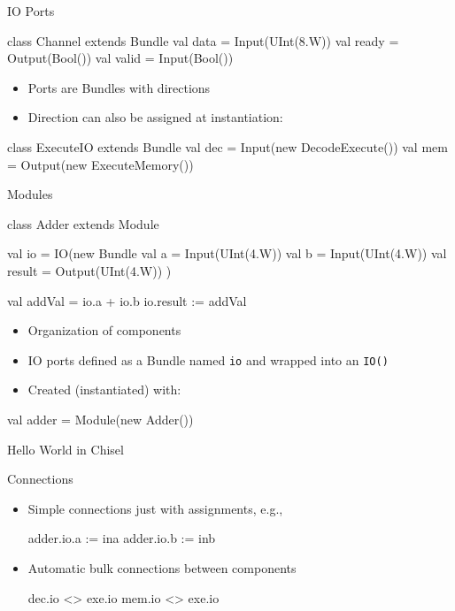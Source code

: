 \documentclass[xcolor=pdflatex,dvipsnames,table]{beamer}
\newcommand{\code}[1]{{\texttt{#1}}}
\begin{document}
\begin{frame}[fragile]{IO Ports}
\begin{chisel}
class Channel extends Bundle {
  val data = Input(UInt(8.W))
  val ready = Output(Bool())
  val valid = Input(Bool())
}
\end{chisel}
\begin{itemize}
\item Ports are Bundles with directions
\item Direction can also be assigned at instantiation:
\end{itemize}
\begin{chisel}
class ExecuteIO extends Bundle {
  val dec = Input(new DecodeExecute())
  val mem = Output(new ExecuteMemory())
}
\end{chisel}
\end{frame}

\begin{frame}[fragile]{Modules}
\begin{chisel}
class Adder extends Module {
  val io = IO(new Bundle {
    val a = Input(UInt(4.W))
    val b = Input(UInt(4.W))
    val result = Output(UInt(4.W))
  })

  val addVal = io.a + io.b
  io.result := addVal
}
\end{chisel}
\begin{itemize}
\item Organization of components
\item IO ports defined as a Bundle named \code{io} and wrapped into an \code{IO()}
\item Created (instantiated) with:
\end{itemize}
\begin{chisel}
val adder = Module(new Adder())
\end{chisel}
\end{frame}

\begin{frame}[fragile]{Hello World in Chisel}
\end{frame}

\begin{frame}[fragile]{Connections}
\begin{itemize}
\item Simple connections just with assignments, e.g.,
\begin{chisel}
  adder.io.a := ina
  adder.io.b := inb
\end{chisel}
\item Automatic bulk connections between components
\begin{chisel}
  dec.io <> exe.io
  mem.io <> exe.io
\end{chisel}
\end{itemize}
\end{frame}
\end{document}
